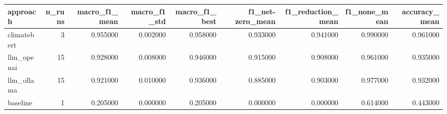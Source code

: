 \begin{tabular}{lrrrrrrrr}
\toprule
approach & n_runs & macro_f1_mean & macro_f1_std & macro_f1_best & f1_net-zero_mean & f1_reduction_mean & f1_none_mean & accuracy_mean \\
\midrule
climatebert & 3 & 0.955000 & 0.002000 & 0.958000 & 0.933000 & 0.941000 & 0.990000 & 0.961000 \\
llm_openai & 15 & 0.928000 & 0.008000 & 0.946000 & 0.915000 & 0.908000 & 0.961000 & 0.935000 \\
llm_ollama & 15 & 0.921000 & 0.010000 & 0.936000 & 0.885000 & 0.903000 & 0.977000 & 0.932000 \\
baseline & 1 & 0.205000 & 0.000000 & 0.205000 & 0.000000 & 0.000000 & 0.614000 & 0.443000 \\
\bottomrule
\end{tabular}
